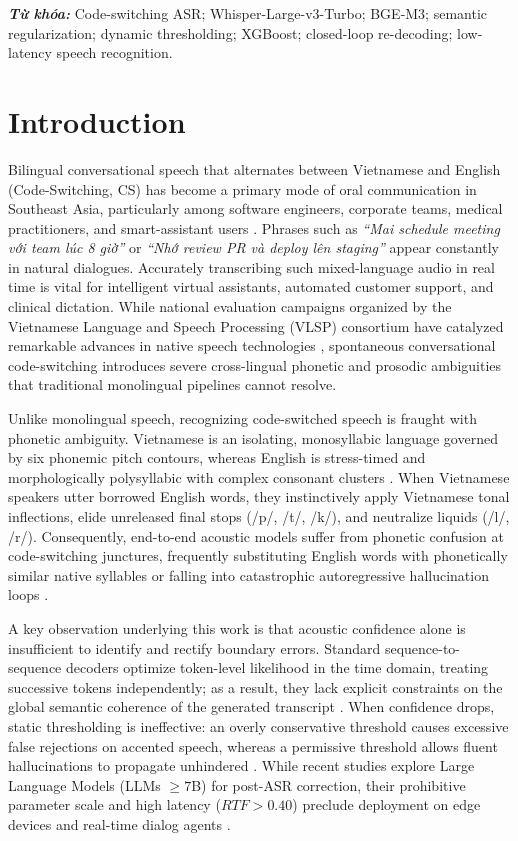 \documentclass[9pt, conference, a4paper, compsocconf]{IEEEtran}
\makeatletter
\renewenvironment{IEEEkeywords}
  {\normalfont
   \@IEEEabskeysecsize
   \vspace{0.3em}       
   \setlength{\parindent}{0pt}
   \noindent
   {\bfseries\itshape \IEEEkeywordsname: }\ignorespaces}
  {\par}
\renewcommand{\IEEEkeywordsname}{Từ khóa}
\makeatother
\begin{document}
\begin{IEEEkeywords}
Code-switching ASR; Whisper-Large-v3-Turbo; BGE-M3; semantic regularization; dynamic thresholding; XGBoost; closed-loop re-decoding; low-latency speech recognition.
\end{IEEEkeywords}

\section{Introduction}
Bilingual conversational speech that alternates between Vietnamese and English (Code-Switching, CS) has become a primary mode of oral communication in Southeast Asia, particularly among software engineers, corporate teams, medical practitioners, and smart-assistant users \cite{do2023code, nguyen2023vietnamese}. Phrases such as \textit{``Mai schedule meeting với team lúc 8 giờ''} or \textit{``Nhớ review PR và deploy lên staging''} appear constantly in natural dialogues. Accurately transcribing such mixed-language audio in real time is vital for intelligent virtual assistants, automated customer support, and clinical dictation. While national evaluation campaigns organized by the Vietnamese Language and Speech Processing (VLSP) consortium \cite{luong2022vlsp} have catalyzed remarkable advances in native speech technologies \cite{nguyen2024phowhisper, luong2016vivos}, spontaneous conversational code-switching introduces severe cross-lingual phonetic and prosodic ambiguities that traditional monolingual pipelines cannot resolve.

Unlike monolingual speech, recognizing code-switched speech is fraught with phonetic ambiguity. Vietnamese is an isolating, monosyllabic language governed by six phonemic pitch contours, whereas English is stress-timed and morphologically polysyllabic with complex consonant clusters \cite{vu2022tonal}. When Vietnamese speakers utter borrowed English words, they instinctively apply Vietnamese tonal inflections, elide unreleased final stops (/p/, /t/, /k/), and neutralize liquids (/l/, /r/). Consequently, end-to-end acoustic models suffer from phonetic confusion at code-switching junctures, frequently substituting English words with phonetically similar native syllables or falling into catastrophic autoregressive hallucination loops \cite{radford2023whisper, li2022confidence}.

A key observation underlying this work is that acoustic confidence alone is insufficient to identify and rectify boundary errors. Standard sequence-to-sequence decoders optimize token-level likelihood in the time domain, treating successive tokens independently; as a result, they lack explicit constraints on the global semantic coherence of the generated transcript \cite{fan2019multi}. When confidence drops, static thresholding is ineffective: an overly conservative threshold causes excessive false rejections on accented speech, whereas a permissive threshold allows fluent hallucinations to propagate unhindered \cite{li2022confidence}. While recent studies explore Large Language Models (LLMs $\ge 7$B) for post-ASR correction, their prohibitive parameter scale and high latency ($RTF > 0.40$) preclude deployment on edge devices and real-time dialog agents \cite{peng2023llm}.
\end{document}
